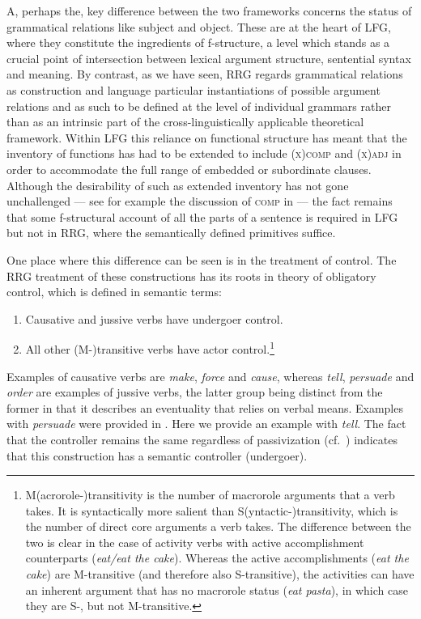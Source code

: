 \documentclass[output=paper,hidelinks]{langscibook}
\begin{document}
A, perhaps the, key difference between the two frameworks concerns the status of grammatical relations like subject and object. These are at the heart of LFG, where they constitute the ingredients of f-structure, a level which stands as a crucial point of intersection between lexical argument structure, sentential syntax and meaning. By contrast, as we have seen, RRG regards grammatical relations as construction and language particular instantiations of possible argument relations and as such to be defined at the level of individual grammars rather than as an intrinsic part of the cross-linguistically applicable theoretical framework. Within LFG this reliance on functional structure has meant that the inventory of functions has had to be extended to include (\textsc{x)comp} and \textsc{(x)adj} in order to accommodate the full range of embedded or subordinate clauses. Although the desirability of such as extended inventory has not gone unchallenged --- see for example the discussion of \textsc{comp} in \citet{patejuk2016reducing} --- the fact remains that some f-structural account of all the parts of a sentence is required in LFG but not in RRG, where the semantically defined primitives suffice.

One place where this difference can be seen is in the treatment of control. The RRG treatment of these constructions has its roots in  theory of obligatory control, which is defined in semantic terms:

\begin{enumerate}
\item Causative and jussive verbs have undergoer control.
\item All other (M-)transitive verbs have actor control.\footnote{M(acrorole-)transitivity is the number of macrorole arguments that a verb takes. It is syntactically more salient than S(yntactic-)transitivity, which is the number of direct core arguments a verb takes. The difference between the two is clear in the case of activity verbs with active accomplishment counterparts (\textit{eat/eat the cake}). Whereas the active accomplishments (\textit{eat the cake}) are M-transitive (and therefore also S-transitive), the activities can have an inherent argument that has no macrorole status (\textit{eat pasta}), in which case they are S-, but not M\nobreakdash-transitive.}
\end{enumerate}

\noindent Examples of causative verbs are \textit{make}, \textit{force} and \textit{cause}, whereas \textit{tell}, \textit{persuade} and \textit{order} are examples of jussive verbs, the latter group being distinct from the former in that it describes an eventuality that relies on verbal means. Examples with \textit{persuade} were provided in . Here we provide an example with \textit{tell}. The fact that the controller remains the same regardless of passivization (cf.\ ) indicates that this construction has a semantic controller (undergoer).
\end{document}
